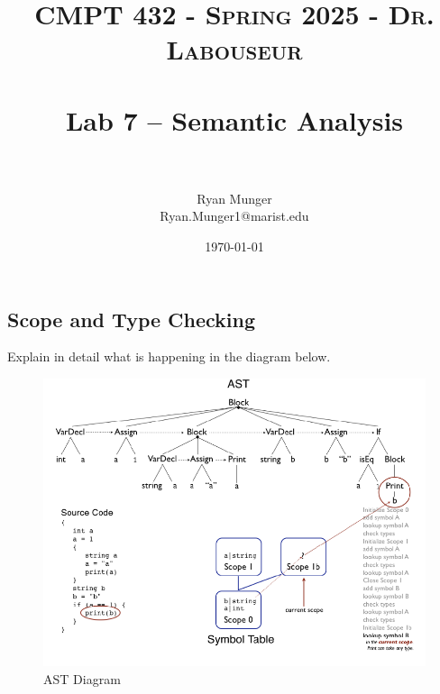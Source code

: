 \documentclass[letterpaper, 10pt]{article}
\title{	
   \normalfont \normalsize 
   \textsc{CMPT 432 - Spring 2025 - Dr. Labouseur} \\[10pt] %
   \horrule{0.5pt} \\[0.25cm] 	%
   \huge Lab 7 -- Semantic Analysis \\     	    %
   \horrule{0.5pt} \\[0.25cm] 	%
}
\author{Ryan Munger \\ \normalsize Ryan.Munger1@marist.edu}
\date{\normalsize\today} 	%
\begin{document}
\maketitle %


\vspace{-.7cm}

\subsection{Scope and Type Checking}
Explain in detail what is happening in the diagram below.

\begin{figure} [h]
    \centering
    \includegraphics[width=1\linewidth]{diagram.png}
    \caption{AST Diagram}
    \label{fig:enter-label}
\end{figure}
\newpage
\end{document}
